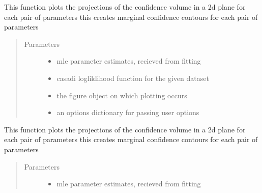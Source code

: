 \documentclass[letterpaper,10pt,english]{sphinxmanual}
\begin{document}
\begin{fulllineitems}

\begin{fulllineitems}
\label{\detokenize{nloed:nloed.model.Model.__contourplot}}
This function plots the projections of the confidence volume in a 2d plane for each pair of parameters
this creates marginal confidence contours for each pair of parameters
\begin{quote}\begin{description}
\item[{Parameters}] \leavevmode\begin{itemize}
\item {} 
 \textendash{} mle parameter estimates,  recieved from fitting

\item {} 
 \textendash{} casadi logliklihood function for the given dataset

\item {} 
 \textendash{} the figure object on which plotting occurs

\item {} 
 \textendash{} an options dictionary for passing user options

\end{itemize}

\end{description}\end{quote}

\end{fulllineitems}


\begin{fulllineitems}
\label{\detokenize{nloed:nloed.model.Model.__contourtrace}}
This function plots the projections of the confidence volume in a 2d plane for each pair of parameters
this creates marginal confidence contours for each pair of parameters
\begin{quote}\begin{description}
\item[{Parameters}] \leavevmode\begin{itemize}
\item {} 
 \textendash{} mle parameter estimates,  recieved from fitting


\end{itemize}
\end{description}
\end{quote}
\end{fulllineitems}
\end{fulllineitems}
\end{document}

